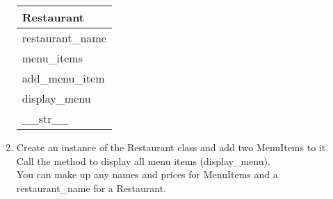 \begin{enumerate}
			\begin{flushright}
			\begin{tabular}{|l|}
				\hline
				Restaurant\\ \hline  	%
				restaurant\_name \\ menu\_items\\ \hline		%
				add\_menu\_item \\ display\_menu \\ \_\_str\_\_ \\ \hline		%
			\end{tabular}
			\end{flushright}

		\item
			Create an instance of the Restaurant class and add two MenuItems to it.\\
			Call the method to display all menu items (display\_menu).\\
			You can make up any names and prices for MenuItems and a restaurant\_name for a Restaurant.\\
	\end{enumerate}
\pagebreak




